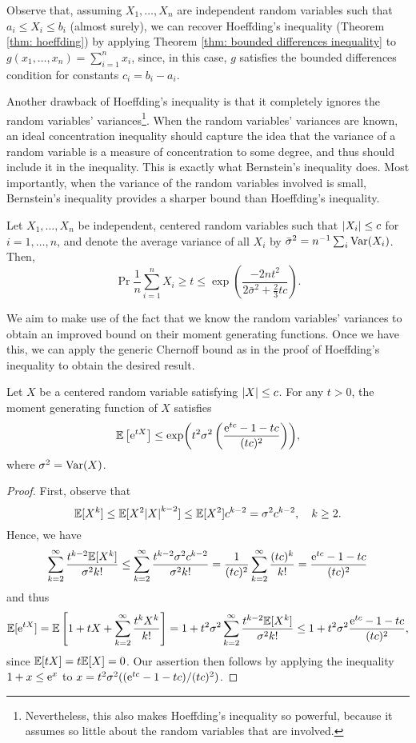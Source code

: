 Observe that, assuming $X_1, \dots, X_n$ are independent random variables such that $a_i \leq X_i \leq b_i$ (almost surely), we can recover Hoeffding's inequality (Theorem \ref{thm: hoeffding}) by applying Theorem \ref{thm: bounded differences inequality} to $g(x_1, \dots, x_n) = \sum_{i=1}^n x_i$, since, in this case, $g$ satisfies the bounded differences condition for constants $c_i = b_i - a_i$.

Another drawback of Hoeffding's inequality is that it completely ignores the random variables' variances\footnote{Nevertheless, this also makes Hoeffding's inequality so powerful, because it assumes so little about the random variables that are involved.}. When the random variables' variances are known, an ideal concentration inequality should capture the idea that the variance of a random variable is a measure of concentration to some degree, and thus should include it in the inequality. This is exactly what Bernstein's inequality does. Most importantly, when the variance of the random variables involved is small, Bernstein's inequality provides a sharper bound than Hoeffding's inequality.

\begin{theorem}
\label{thm: bernstein}
Let $X_1, \dots, X_n$ be independent, centered random variables such that $\abs{X_i} \leq c$ for $i = 1, \dots, n$, and denote the average variance of all $X_i$ by $\bar\sigma^2 = n^{-1} \sum_i \mathrm{Var}(X_i)$. Then,
\[
    \Pr{\frac{1}{n} \sum_{i=1}^n X_i \geq t} \leq \exp(\frac{-2nt^2}{2\bar\sigma^2 + \frac{2}{3}tc}).
\]
\end{theorem}

We aim to make use of the fact that we know the random variables' variances to obtain an improved bound on their moment generating functions. Once we have this, we can apply the generic Chernoff bound as in the proof of Hoeffding's inequality to obtain the desired result.

\begin{lemma}
\label{lem: bernstein}
Let $X$ be a centered random variable satisfying $\abs{X} \leq c$. For any $t > 0$, the moment generating function of $X$ satisfies
\[
    \mathbb{E}\left[\mathrm{e}^{tX}\right] \leq \exp( t^2 \sigma^2 \left( \frac{\mathrm{e}^{tc} - 1 - tc}{(tc)^2} \right) ),
\]
where $\sigma^2 = \mathrm{Var}(X)$.
\end{lemma}

\begin{proof}
First, observe that
\[
    \mathbb{E}[X^k] \leq \mathbb{E}[X^2 \abs{X}^{k-2}] \leq \mathbb{E}[X^2] c^{k-2} = \sigma^2 c^{k-2}, \quad k \geq 2.
\]
Hence, we have
\[
    \sum_{k=2}^\infty \frac{t^{k-2} \mathbb{E}[X^k]}{\sigma^2 k!} \leq \sum_{k=2}^\infty \frac{t^{k-2} \sigma^2 c^{k-2}}{\sigma^2 k!} = \frac{1}{(tc)^2} \sum_{k=2}^\infty \frac{(tc)^k}{k!} = \frac{\mathrm{e}^{tc} - 1 - tc}{(tc)^2}
\]
and thus
\[
    \mathbb{E}[\mathrm{e}^{tX}] = \mathbb{E}\left[1 + tX + \sum_{k=2}^\infty \frac{t^k X^k}{k!}\right] = 1 + t^2 \sigma^2 \sum_{k=2}^\infty \frac{t^{k-2} \mathbb{E}[X^k]}{\sigma^2 k!} \leq 1 + t^2 \sigma^2 \frac{\mathrm{e}^{tc} - 1 - tc}{(tc)^2},
\]
since $\mathbb{E}[tX] = t \mathbb{E}[X] = 0$. Our assertion then follows by applying the inequality $1 + x \leq \mathrm{e}^x$ to $x = t^2 \sigma^2 ((\mathrm{e}^{tc} - 1 - tc)/(tc)^2)$.
\end{proof}

